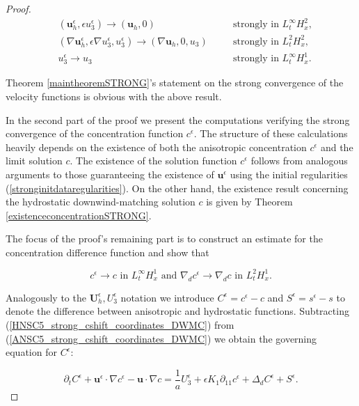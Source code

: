 \documentclass[12pt]{report}
\numberwithin{theorem}{chapter}
\numberwithin{corollary}{chapter}
\numberwithin{lemma}{chapter}
\numberwithin{remark}{chapter}
\numberwithin{definition}{chapter}
\numberwithin{prop}{chapter}
\begin{document}
\begin{proof}
  \begin{align}
    &  (\mathbf{u}_h^\epsilon, \epsilon u_3^\epsilon) \to (\mathbf{u}_h, 0) &\quad & \text{strongly in $L_t^\infty H_x^2$,} \label{StrongConvVelocity1} \\
    &  (\nabla \mathbf{u}_h^\epsilon, \epsilon \nabla u_3^\epsilon, u_3^\epsilon) \to (\nabla \mathbf{u}_h, 0, u_3) &\quad & \text{strongly in $L_t^2 H_x^2$,} \label{StrongConvVelocity2} \\ 
    &  u_3^\epsilon \to u_3 &\quad & \text{strongly in $L_t^\infty H_x^1.$} \label{StrongConvVelocity3}
  \end{align}

Theorem \ref{maintheoremSTRONG}'s statement on the strong convergence of the velocity functions is obvious with the above result.

In the second part of the proof we present the computations verifying the strong convergence of the concentration function $c^\epsilon.$ The structure of these calculations heavily depends on the existence of both the anisotropic concentration $c^\epsilon$ and the limit solution $c.$ The existence of the solution function $c^\epsilon$ follows from analogous arguments to those guaranteeing the existence of $\mathbf{u}^\epsilon$ using the initial regularities (\ref{stronginitdataregularities}). On the other hand, the existence result concerning the hydrostatic downwind-matching solution $c$ is given by Theorem \ref{existenceconcentrationSTRONG}.

The focus of the proof's remaining part is to construct an estimate for the concentration difference function and show that

\begin{equation}
  c^\epsilon \to c \text{ in } L_t^\infty H_x^1 \text{ and } \nabla_d c^\epsilon \to \nabla_d c \text{ in } L_t^2 H_x^1.
\end{equation}

Analogously to the $\mathbf{U}_h^\epsilon, U_3^\epsilon$ notation we introduce $C^\epsilon = c^\epsilon-c$ and $S^\epsilon = s^\epsilon-s$ to denote the difference between anisotropic and hydrostatic functions. Subtracting (\ref{HNSC5_strong_cshift_coordinates_DWMC}) from (\ref{ANSC5_strong_cshift_coordinates_DWMC}) we obtain the governing equation for $C^\epsilon:$

\begin{equation}
  \partial_t C^\epsilon + \mathbf{u}^\epsilon \cdot \nabla c^\epsilon - \mathbf{u} \cdot \nabla c = \frac{1}{a} U_3^\epsilon + \epsilon K_1 \partial_{11} c^\epsilon + \Delta_d C^\epsilon + S^\epsilon.
\end{equation}


\end{proof}
\end{document}
